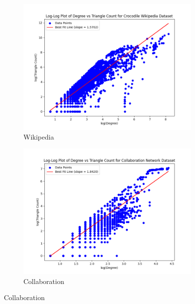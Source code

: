 \documentclass[11pt, margin=1in]{article}
\begin{document}
\begin{figure}[H]
    \centering
    \begin{subfigure}[b]{0.495\textwidth}
        \centering
        \includegraphics[width=\textwidth]{plots/degree-vs-triangle-count/degree_vs_triangle_count_croc.png}
        \caption{Wikipedia}
        \label{fig:degree_vs_tri_croc}
    \end{subfigure}
    \hfill
    \begin{subfigure}[b]{0.495\textwidth}
        \centering
        \includegraphics[width=\textwidth]{plots/degree-vs-triangle-count/degree_vs_triangle_count_GrQc.png}
        \caption{Collaboration}
        \label{fig:degree_vs_tri_GrQc}
    \end{subfigure}

\end{figure}
\end{document}
